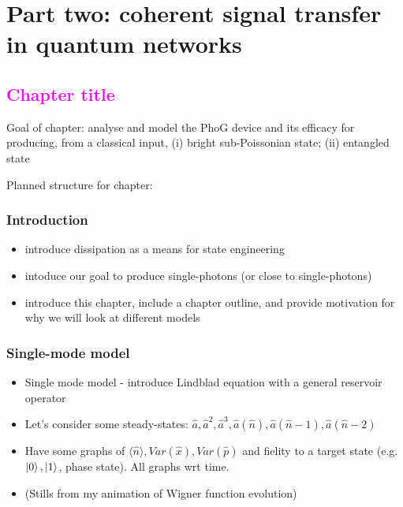 \documentclass{article}
\def\MT #1{\textcolor{magenta}{#1}}
\begin{document}
\section*{Part two: coherent signal transfer in quantum networks}
\subsection*{\MT{Chapter title}}
Goal of chapter: analyse and model the PhoG device and its efficacy for producing, from a classical input, (i) bright sub-Poissonian state; (ii) entangled state

Planned structure for chapter:
\subsubsection*{Introduction}
\begin{itemize}
\item introduce dissipation as a means for state engineering
\item intoduce our goal to produce single-photons (or close to single-photons)
\item introduce this chapter, include a chapter outline, and provide motivation for why we will look at different models
\end{itemize}

\subsubsection*{Single-mode model}
\begin{itemize}
\item Single mode model - introduce Lindblad equation with a general reservoir operator
\item Let's consider some steady-states: $\hat{a}, \hat{a}^2, \hat{a}^3, \hat{a}\left(\hat{n}\right), \hat{a}\left(\hat{n} - 1\right), \hat{a}\left(\hat{n}-2\right)$
\item Have some graphs of $\langle \hat{n}\rangle, Var\left(\hat{x}\right), Var\left(\hat{p}\right)$ and fielity to a target state (e.g. $\ket{0}, \ket{1}$, phase state). All graphs wrt time.
\item (Stills from my animation of Wigner function evolution)
\end{itemize}
\end{document}
